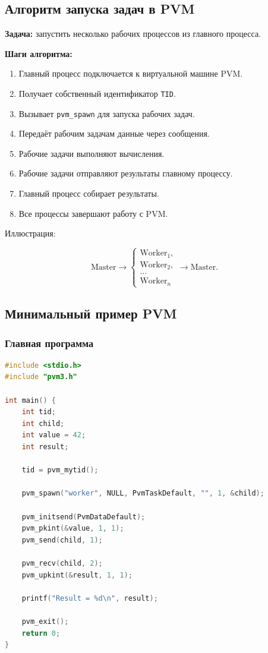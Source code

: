 \documentclass[12pt,a4paper]{article}
\begin{document}
\subsection{Алгоритм запуска задач в PVM}

\textbf{Задача:} запустить несколько рабочих процессов из главного процесса.

\textbf{Шаги алгоритма:}
\begin{enumerate}
    \item Главный процесс подключается к виртуальной машине PVM.
    \item Получает собственный идентификатор \texttt{TID}.
    \item Вызывает \texttt{pvm\_spawn} для запуска рабочих задач.
    \item Передаёт рабочим задачам данные через сообщения.
    \item Рабочие задачи выполняют вычисления.
    \item Рабочие задачи отправляют результаты главному процессу.
    \item Главный процесс собирает результаты.
    \item Все процессы завершают работу с PVM.
\end{enumerate}

Иллюстрация:

\[
\text{Master}
\rightarrow
\begin{cases}
\text{Worker}_1,\\
\text{Worker}_2,\\
\ldots\\
\text{Worker}_n
\end{cases}
\rightarrow
\text{Master}.
\]

\subsection{Минимальный пример PVM}

\subsubsection{Главная программа}

\begin{lstlisting}[language=C]
#include <stdio.h>
#include "pvm3.h"

int main() {
    int tid;
    int child;
    int value = 42;
    int result;

    tid = pvm_mytid();

    pvm_spawn("worker", NULL, PvmTaskDefault, "", 1, &child);

    pvm_initsend(PvmDataDefault);
    pvm_pkint(&value, 1, 1);
    pvm_send(child, 1);

    pvm_recv(child, 2);
    pvm_upkint(&result, 1, 1);

    printf("Result = %d\n", result);

    pvm_exit();
    return 0;
}
\end{lstlisting}
\end{document}
